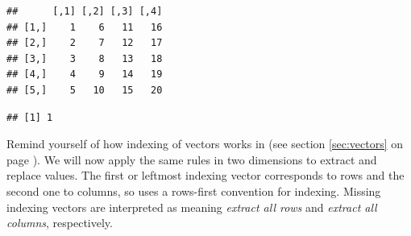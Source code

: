\documentclass[krantz2]{krantz}\usepackage{knitr}
\begin{document}
\begin{knitrout}\footnotesize
{}\color{fgcolor}\begin{kframe}
\begin{alltt}
 \hlkwb{<-} \hlstd{(}\hlopt{:}\hlstd{,}  \hlstd{=} \hlstd{)}
\end{alltt}
\begin{verbatim}
##      [,1] [,2] [,3] [,4]
## [1,]    1    6   11   16
## [2,]    2    7   12   17
## [3,]    3    8   13   18
## [4,]    4    9   14   19
## [5,]    5   10   15   20
\end{verbatim}
\begin{alltt}
\hlstd{A[}\hlstd{,} \hlstd{]}
\end{alltt}
\begin{verbatim}
## [1] 1
\end{verbatim}
\end{kframe}
\end{knitrout}

Remind yourself of how indexing of vectors works in \Rlang (see section \ref{sec:vectors} on page \pageref{sec:vectors}). We will now apply the same rules in two dimensions to extract and replace values. The first or leftmost indexing vector corresponds to rows and the second one to columns, so \Rlang uses a rows-first convention for indexing. Missing indexing vectors are interpreted as meaning \emph{extract all rows} and \emph{extract all columns}, respectively.
\end{document}
